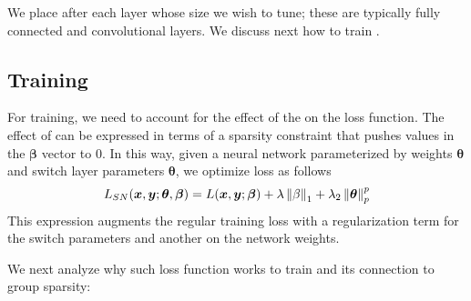 We place \swl after each layer whose size we wish to tune; these are
typically fully connected and convolutional layers. We discuss next how to train
\shrink.

\subsection{Training \shrink} 


For training, we need to account for the effect of the \swls on the loss
function. The effect of \swls can be expressed in terms of a sparsity constraint
that pushes values in the $\bm{\beta}$ vector to 0. In this way, given a neural network
parameterized by weights $\bm{\theta}$ and switch layer parameters $\bm{\theta}$, we
optimize \shrink loss as follows 
\begin{equation}
\small
  L_{SN}(\bm{x},\bm{y};\bm{\theta}, \bm{\beta}) = L(\bm{x}, \bm{y}; \bm{\beta}) +
  \lambda\norm{\beta}_1 + \lambda_2\norm{\bm{\theta}}_p^p
\end{equation}
This expression augments the regular training loss with a regularization
term for the switch parameters and another on the network weights.

We next analyze why such loss function works to train \shrink and its
connection to group sparsity:


